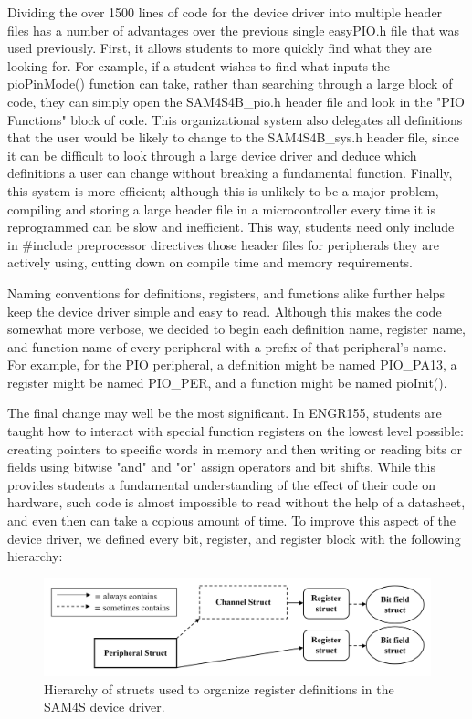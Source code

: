 \documentclass[12pt]{article}
\begin{document}
    Dividing the over 1500 lines of code for the device driver into multiple header files has a number of advantages over the previous single easyPIO.h file that was used previously. First, it allows students to more quickly find what they are looking for. For example, if a student wishes to find what inputs the pioPinMode() function can take, rather than searching through a large block of code, they can simply open the SAM4S4B\_pio.h header file and look in the "PIO Functions" block of code. This organizational system also delegates all definitions that the user would be likely to change to the SAM4S4B\_sys.h header file, since it can be difficult to look through a large device driver and deduce which definitions a user can change without breaking a fundamental function. Finally, this system is more efficient; although this is unlikely to be a major problem, compiling and storing a large header file in a microcontroller every time it is reprogrammed can be slow and inefficient. This way, students need only include in #include preprocessor directives those header files for peripherals they are actively using, cutting down on compile time and memory requirements.
    
    Naming conventions for definitions, registers, and functions alike further helps keep the device driver simple and easy to read. Although this makes the code somewhat more verbose, we decided to begin each definition name, register name, and function name of every peripheral with a prefix of that peripheral's name. For example, for the PIO peripheral, a definition might be named PIO\_PA13, a register might be named PIO\_PER, and a function might be named pioInit().
    
    The final change may well be the most significant. In ENGR155, students are taught how to interact with special function registers on the lowest level possible: creating pointers to specific words in memory and then writing or reading bits or fields using bitwise "and" and "or" assign operators and bit shifts. While this provides students a fundamental understanding of the effect of their code on hardware, such code is almost impossible to read without the help of a datasheet, and even then can take a copious amount of time. To improve this aspect of the device driver, we defined every bit, register, and register block with the following hierarchy:

    \begin{figure}[h]
        \label{headerChart}
	    \begin{center}
	        \includegraphics[width=14cm]{headerFileOrganization.png}
	        \caption{Hierarchy of structs used to organize register definitions in the SAM4S device driver.}	
	    \end{center}
    \end{figure}
\end{document}
